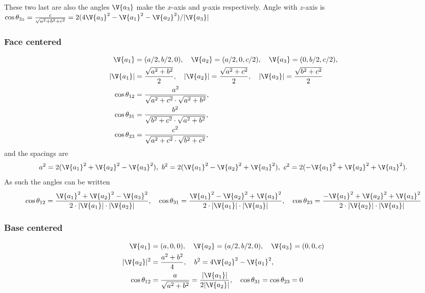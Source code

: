 \documentclass[main.tex]{subfiles}
\begin{document}
	These two last are also the angles $ \V{a_3} $ make the $ x $-axis and $ y $-axis respectively. Angle with $ z $-axis is $\cos\theta_{3z} = \frac{c}{\sqrt{a^2+b^2+c^2}} = 2(4\V{a_3}^2-\V{a_1}^2-\V{a_2}^2)/|\V{a_3}|$
	
	\subsubsection*{Face centered}
	\begin{align*} 
	\V{a_1} &= (a/2,b/2,0), \quad \V{a_2} = (a/2,0,c/2), \quad \V{a_3} = (0,b/2,c/2), \\
	|\V{a_1}| &= \frac{\sqrt{a^2+b^2}}{2}, \quad |\V{a_2}| = \frac{\sqrt{a^2+c^2}}{2}, \quad |\V{a_3}| = \frac{\sqrt{b^2+c^2}}{2} \\
	\cos \theta_{12} &= \frac{a^2}{\sqrt{a^2+c^2} \cdot \sqrt{a^2+b^2}}, \\
	\cos \theta_{31} &= \frac{b^2}{\sqrt{b^2+c^2} \cdot \sqrt{a^2+b^2}},\\
	\cos \theta_{23} &= \frac{c^2}{\sqrt{a^2+c^2} \cdot \sqrt{b^2+c^2}},
	\end{align*}
	and the spacings are
	\begin{equation*}
		a^2 = 2 (\V{a_1}^2+\V{a_2}^2-\V{a_3}^2), \ b^2 = 2(\V{a_1}^2-\V{a_2}^2+\V{a_3}^2), \ c^2 = 2(-\V{a_1}^2+\V{a_2}^2+\V{a_3}^2).
	\end{equation*}
	As such the angles can be written
	\begin{equation*}
		\cos \theta_{12} = \frac{\V{a_1}^2+\V{a_2}^2-\V{a_3}^2}{2 \cdot |\V{a_1}| \cdot |\V{a_2}|}, \quad
		\cos \theta_{31} = \frac{\V{a_1}^2-\V{a_2}^2+\V{a_3}^2}{2 \cdot |\V{a_1}| \cdot |\V{a_3}|}, \quad
		\cos \theta_{23} = \frac{-\V{a_1}^2+\V{a_2}^2+\V{a_3}^2}{2 \cdot |\V{a_2}| \cdot |\V{a_3}|}
	\end{equation*}
	
	
	\subsubsection*{Base centered}
	\begin{align*}
		\V{a_1} &= (a,0,0),\quad \V{a_2} = (a/2,b/2,0),\quad \V{a_3} = (0,0,c) \\
		|\V{a_2}|^2 &= \frac{a^2+b^2}{4}, \quad b^2 = 4\V{a_2}^2-\V{a_1}^2, \\
		\cos \theta_{12} &= \frac{a}{\sqrt{a^2+b^2}} = \frac{|\V{a_1}|}{2|\V{a_2}|}, \quad \cos\theta_{31} = \cos \theta_{23} = 0
	\end{align*}
	
\end{document}
